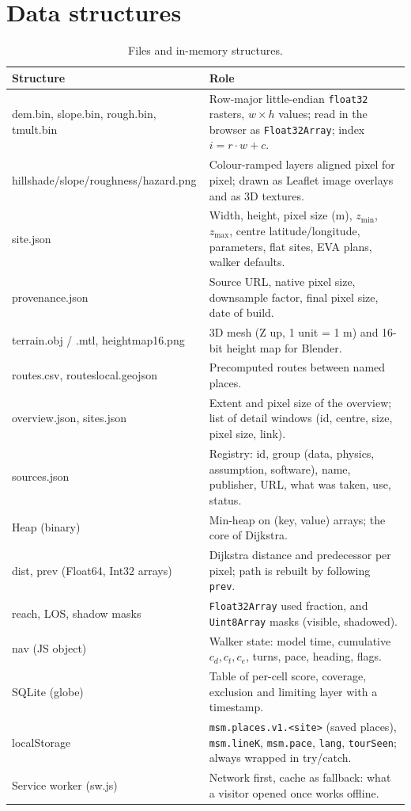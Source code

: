 \documentclass[11pt,a4paper]{article}
\renewcommand{\_}{\textunderscore\allowbreak}
\newcommand{\code}[1]{\texttt{#1}}
\begin{document}
\section{Data structures}
\begin{table}[h]\centering\small
\begin{tabularx}{\textwidth}{@{}>{\ttfamily}l>{\raggedright\arraybackslash}X@{}}
\toprule
\textbf{Structure} & \textbf{Role}\\\midrule
dem.bin, slope.bin, rough.bin, tmult.bin & Row-major little-endian \code{float32} rasters, $w\times h$ values; read in the browser as \code{Float32Array}; index $i=r\cdot w+c$.\\
hillshade/slope/roughness/hazard.png & Colour-ramped layers aligned pixel for pixel; drawn as Leaflet image overlays and as 3D textures.\\
site.json & Width, height, pixel size (m), $z_\text{min}$, $z_\text{max}$, centre latitude/longitude, parameters, flat sites, EVA plans, walker defaults.\\
provenance.json & Source URL, native pixel size, downsample factor, final pixel size, date of build.\\
terrain.obj / .mtl, heightmap16.png & 3D mesh (Z up, 1 unit = 1 m) and 16-bit height map for Blender.\\
routes.csv, routes\_local.geojson & Precomputed routes between named places.\\
overview.json, sites.json & Extent and pixel size of the overview; list of detail windows (id, centre, size, pixel size, link).\\
sources.json & Registry: id, group (data, physics, assumption, software), name, publisher, URL, what was taken, use, status.\\
Heap (binary) & Min-heap on (key, value) arrays; the core of Dijkstra.\\
dist, prev (Float64, Int32 arrays) & Dijkstra distance and predecessor per pixel; path is rebuilt by following \code{prev}.\\
reach, LOS, shadow masks & \code{Float32Array} used fraction, and \code{Uint8Array} masks (visible, shadowed).\\
nav (JS object) & Walker state: model time, cumulative $c_d,c_t,c_e$, turns, pace, heading, flags.\\
SQLite (globe) & Table of per-cell score, coverage, exclusion and limiting layer with a timestamp.\\
localStorage & \code{msm.places.v1.<site>} (saved places), \code{msm.lineK}, \code{msm.pace}, \code{lang}, \code{tourSeen}; always wrapped in try/catch.\\
Service worker (sw.js) & Network first, cache as fallback: what a visitor opened once works offline.\\\bottomrule
\end{tabularx}
\caption{Files and in-memory structures.}
\end{table}
\end{document}

